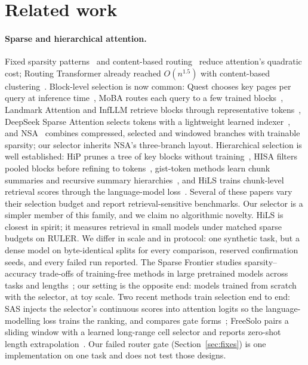 \section{Related work}
\label{sec:related}

\paragraph{Sparse and hierarchical attention.} Fixed sparsity patterns~\cite{child2019sparse,beltagy2020longformer,
zaheer2020bigbird} and content-based routing~\cite{kitaev2020reformer,roy2021routing} reduce attention's quadratic
cost; Routing Transformer already reached $O(n^{1.5})$ with content-based clustering~\cite{roy2021routing}.
Block-level selection is now common: Quest chooses key pages per query at inference time~\cite{tang2024quest}, MoBA
routes each query to a few trained blocks~\cite{lu2025moba}, Landmark Attention and InfLLM retrieve blocks through
representative tokens~\cite{mohtashami2023landmark,xiao2024infllm}, DeepSeek Sparse Attention selects tokens with a
lightweight learned indexer~\cite{deepseek2025v32}, and NSA~\cite{yuan2025nsa} combines compressed, selected and windowed
branches with trainable sparsity; our selector inherits NSA's three-branch layout. Hierarchical selection is well established: HiP prunes a tree of key blocks without
training~\cite{lee2025hip}, HISA filters pooled blocks before refining to tokens~\cite{xu2026hisa}, gist-token methods
learn chunk summaries and recursive summary hierarchies~\cite{mao2026gist}, and HiLS trains chunk-level retrieval scores
through the language-model loss~\cite{hu2026hils}. Several of these papers vary their selection budget and report
retrieval-sensitive benchmarks. Our
selector is a simpler member of this family, and we claim no algorithmic novelty. HiLS is closest in spirit; it
measures retrieval in small models under matched sparse budgets on RULER. We differ in scale and in protocol: one
synthetic task, but a dense model on byte-identical splits for every comparison, reserved confirmation seeds, and
every failed run reported. The Sparse Frontier studies sparsity--accuracy trade-offs of training-free methods in
large pretrained models across tasks and lengths~\cite{nawrot2025sparsefrontier}; our setting is the opposite end:
models trained from scratch with the selector, at toy scale. Two recent methods train selection end to end: SAS injects
the selector's continuous scores into attention logits so the language-modelling loss trains the ranking, and
compares gate forms~\cite{li2026sas}; FreeSolo pairs a sliding window with a learned long-range cell selector and
reports zero-shot length extrapolation~\cite{shi2026freesolo}. Our failed router gate (Section~\ref{sec:fixes}) is one
implementation on one task and does not test those designs.

